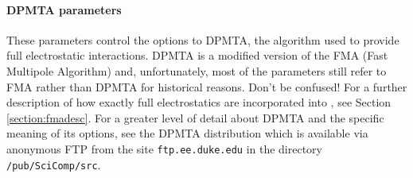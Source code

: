 \paragraph{DPMTA parameters}

These parameters control the options to DPMTA, the algorithm
used to provide full electrostatic interactions.  DPMTA is a
modified version of the FMA (Fast Multipole Algorithm) and, 
unfortunately, most of the parameters still refer to FMA
rather than DPMTA for historical reasons.  Don't be confused!
\prettypar
For a further description of how exactly full electrostatics
are incorporated into \NAMD, see Section \ref{section:fmadesc}.
For a greater level of detail about DPMTA and the specific
meaning of its options, see the DPMTA distribution which is
available via anonymous FTP from the site \verb!ftp.ee.duke.edu!
in the directory \verb!/pub/SciComp/src!.

